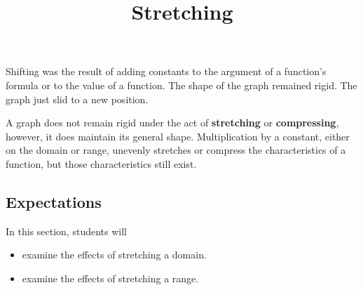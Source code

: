 \documentclass{ximera}
\title{Stretching}
\begin{document}
\begin{abstract}
\end{abstract}
\maketitle




Shifting was the result of adding constants to the argument of a function's formula or to the value of a function.  The shape of the graph remained rigid. The graph just slid to a new position. 



A graph does not remain rigid under the act of \textbf{stretching} or \textbf{compressing}, however, it does maintain its general shape. Multiplication by a constant, either on the domain or range, unevenly stretches or compress the characteristics of a function, but those characteristics still exist.



















\subsection{Expectations}


\begin{sectionOutcomes}
In this section, students will 

\begin{itemize}
\item examine the effects of stretching a domain.
\item examine the effects of stretching a range.
\end{itemize}
\end{sectionOutcomes}
\end{document}
